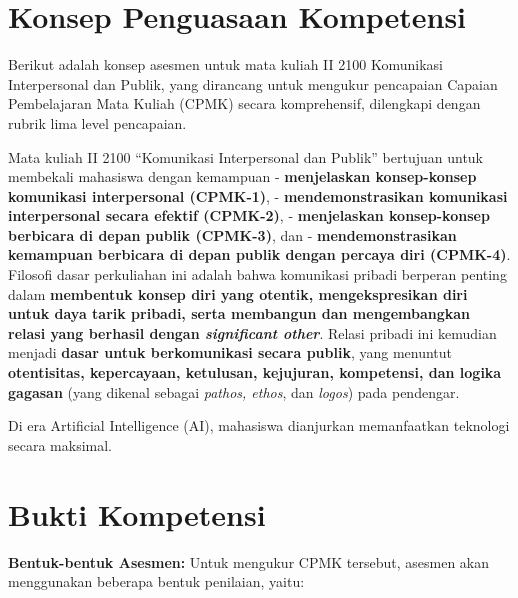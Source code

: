 \documentclass[
  letterpaper,
  DIV=11,
  numbers=noendperiod]{scrreprt}
\begin{document}
\section*{Konsep Penguasaan
Kompetensi}\label{konsep-penguasaan-kompetensi}


Berikut adalah konsep asesmen untuk mata kuliah II 2100 Komunikasi
Interpersonal dan Publik, yang dirancang untuk mengukur pencapaian
Capaian Pembelajaran Mata Kuliah (CPMK) secara komprehensif, dilengkapi
dengan rubrik lima level pencapaian.

Mata kuliah II 2100 ``Komunikasi Interpersonal dan Publik'' bertujuan
untuk membekali mahasiswa dengan kemampuan - \textbf{menjelaskan
konsep-konsep komunikasi interpersonal (CPMK-1)}, -
\textbf{mendemonstrasikan komunikasi interpersonal secara efektif
(CPMK-2)}, - \textbf{menjelaskan konsep-konsep berbicara di depan publik
(CPMK-3)}, dan - \textbf{mendemonstrasikan kemampuan berbicara di depan
publik dengan percaya diri (CPMK-4)}. Filosofi dasar perkuliahan ini
adalah bahwa komunikasi pribadi berperan penting dalam \textbf{membentuk
konsep diri yang otentik, mengekspresikan diri untuk daya tarik pribadi,
serta membangun dan mengembangkan relasi yang berhasil dengan
\emph{significant other}}. Relasi pribadi ini kemudian menjadi
\textbf{dasar untuk berkomunikasi secara publik}, yang menuntut
\textbf{otentisitas, kepercayaan, ketulusan, kejujuran, kompetensi, dan
logika gagasan} (yang dikenal sebagai \emph{pathos, ethos}, dan
\emph{logos}) pada pendengar.

Di era Artificial Intelligence (AI), mahasiswa dianjurkan memanfaatkan
teknologi secara maksimal.

\section*{Bukti Kompetensi}\label{bukti-kompetensi}


\textbf{Bentuk-bentuk Asesmen:} Untuk mengukur CPMK tersebut, asesmen
akan menggunakan beberapa bentuk penilaian, yaitu:
\end{document}
